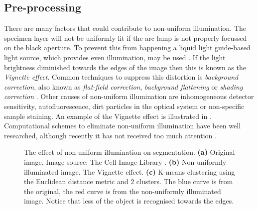 \subsection{Pre-processing}

\begin{definition}[Non-uniform illumination]
	There are many factors that could contribute to non-uniform illumination.
	The specimen layer will not be uniformly lit if the  arc lamp is not properly focussed on the black aperture.
	To prevent this from happening a liquid light guide-based light source, which provides even illumination, may be used \citep{LichtmanConchello2005}.
	If the light brightness diminished towards the edges of the image then this is known as the \textit{Vignette effect}.
	Common techniques to suppress this distortion is \textit{background correction}, also known as \textit{flat-field correction}, \textit{background flattening} or \textit{shading correction} \citep{Danek2012,Fatima2008,Murphy2001}.
	Other causes of non-uniform illumination are inhomogeneous detector sensitivity, autofluorescence, dirt particles in the optical system or non-specific sample staining.
	An example of the Vignette effect is illustrated in .
	Computational schemes to eliminate non-uniform illumination have been well researched, although recently it has not received too much attention \citep{Young2001,Ghauharali1998,Model2001,Model2001_2}.
	
	\begin{figure}[!t]
		\centering
		\caption{The effect of non-uniform illumination on segmentation. \textbf{(a)} Original image. Image source: The Cell Image Library \citep{cil:21739}. \textbf{(b)} Non-uniformly illuminated image. The Vignette effect. \textbf{(c)} K-means clustering using the Euclidean distance metric and 2 clusters. The blue curve is from the original, the red curve is from the non-uniformly illuminated image. Notice that less of the object is recognised towards the edges.}
		\label{fig:illumination}
	\end{figure}
\end{definition}

